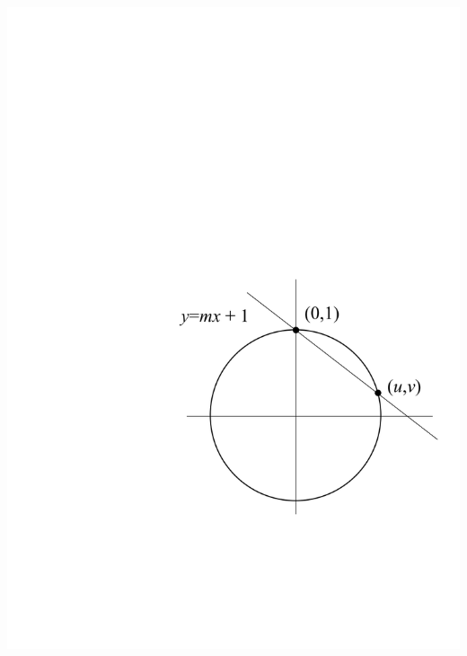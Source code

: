 \documentclass[11pt]{amsart}
\begin{document}
\newpage

\begin{center}
\includegraphics{pics/pythag-triples}
\end{center}
\end{document}
